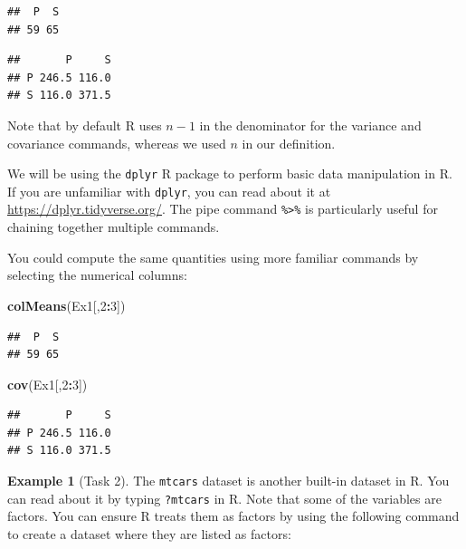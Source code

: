 \documentclass[]{book}
\newenvironment{Shaded}{\begin{snugshade}}{\end{snugshade}}
\newcommand{\DecValTok}[1]{\textcolor[rgb]{0.00,0.00,0.81}{#1}}
\newcommand{\KeywordTok}[1]{\textcolor[rgb]{0.13,0.29,0.53}{\textbf{#1}}}
\newcommand{\NormalTok}[1]{#1}
\newcommand{\OperatorTok}[1]{\textcolor[rgb]{0.81,0.36,0.00}{\textbf{#1}}}
\newcommand{\StringTok}[1]{\textcolor[rgb]{0.31,0.60,0.02}{#1}}
\theoremstyle{definition}
\theoremstyle{definition}
\newtheorem{example}{Example}[chapter]
\theoremstyle{definition}
\theoremstyle{remark}
\begin{document}
\begin{verbatim}
##  P  S 
## 59 65
\end{verbatim}

\begin{Shaded}
\end{Shaded}

\begin{verbatim}
##       P     S
## P 246.5 116.0
## S 116.0 371.5
\end{verbatim}

Note that by default R uses \(n-1\) in the denominator for the variance and covariance commands, whereas we used \(n\) in our definition.

We will be using the \texttt{dplyr} R package to perform basic data manipulation in R.
If you are unfamiliar with \texttt{dplyr}, you can read about it at \url{https://dplyr.tidyverse.org/}.
The pipe command \texttt{\%\textgreater{}\%} is particularly useful for chaining together multiple commands.

You could compute the same quantities using more familiar commands by selecting the numerical columns:

\begin{Shaded}
\begin{Highlighting}[]
\KeywordTok{colMeans}\NormalTok{(Ex1[,}\DecValTok{2}\OperatorTok{:}\DecValTok{3}\NormalTok{])}
\end{Highlighting}
\end{Shaded}

\begin{verbatim}
##  P  S 
## 59 65
\end{verbatim}

\begin{Shaded}
\begin{Highlighting}[]
\KeywordTok{cov}\NormalTok{(Ex1[,}\DecValTok{2}\OperatorTok{:}\DecValTok{3}\NormalTok{])}
\end{Highlighting}
\end{Shaded}

\begin{verbatim}
##       P     S
## P 246.5 116.0
## S 116.0 371.5
\end{verbatim}

\begin{example}[Task 2]
\protect\hypertarget{exm:unnamed-chunk-14}{}{\label{exm:unnamed-chunk-14} {} }
The \texttt{mtcars} dataset is another built-in dataset in R. You can read about it by typing \texttt{?mtcars} in R. Note that some of the variables are factors. You can ensure R treats them as factors by using the following command to create a dataset where they are listed as factors:
\end{example}
\end{document}
